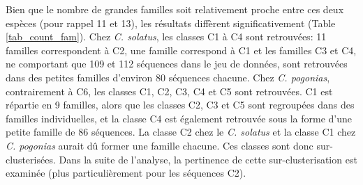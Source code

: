 \documentclass[12pt,a4paper]{article}
\begin{document}
	Bien que le nombre de grandes familles soit relativement proche entre ces deux espèces (pour rappel 11 et 13), les résultats diffèrent significativement (Table \ref{tab_count_fam}). Chez \textit{C. solatus}, les classes C1 à C4 sont retrouvées: 11 familles correspondent à C2, une famille correspond à C1 et les familles C3 et C4, ne comportant que 109 et 112 séquences dans le jeu de données, sont retrouvées dans des petites familles d'environ 80 séquences chacune. Chez \textit{C. pogonias}, contrairement à C6, les classes C1, C2, C3, C4 et C5 sont retrouvées. C1 est répartie en 9 familles, alors que les classes C2, C3 et C5 sont regroupées dans des familles individuelles, et la classe C4 est également retrouvée sous la forme d'une petite famille de 86 séquences. La classe C2 chez le \textit{C. solatus} et la classe C1 chez \textit{C. pogonias} aurait dû former une famille chacune. Ces classes sont donc sur-clusterisées. Dans la suite de l'analyse, la pertinence de cette sur-clusterisation est examinée (plus particulièrement pour les séquences C2).
	
\end{document}
